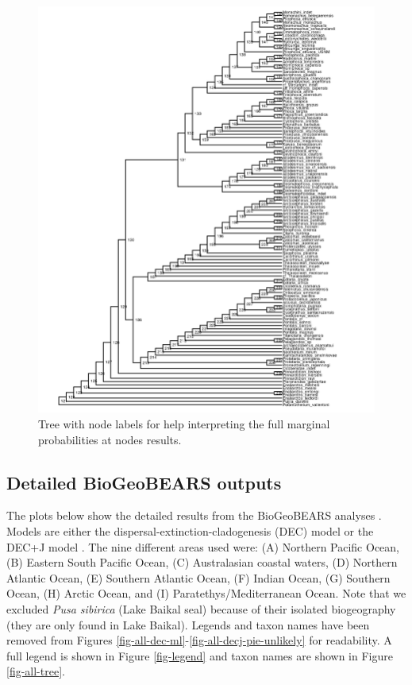 \documentclass[a4paper, 12pt]{article}
\begin{document}
\begin{figure}[H]
 \centering
  \includegraphics[width = \linewidth]{figures/node-labels-tree.png}
  \caption{Tree with node labels for help interpreting the full marginal probabilities at nodes results.}
  \label{fig-node-labels}
\end{figure}  

\subsection{Detailed BioGeoBEARS outputs}

The plots below show the detailed results from the BioGeoBEARS analyses \citep{matzke2013probabilistic}. Models are either the dispersal-extinction-cladogenesis (DEC) model \citep{ree2008maximum} or the DEC+J model \citep{matzke2014model}. 
The nine different areas used were: (A) Northern Pacific Ocean, (B) Eastern South Pacific Ocean, (C) Australasian coastal waters, (D) Northern Atlantic Ocean, (E) Southern Atlantic Ocean, (F) Indian Ocean, (G) Southern Ocean, (H) Arctic Ocean, and (I) Paratethys/Mediterranean Ocean. Note that we excluded \textit{Pusa sibirica} (Lake Baikal seal) because of their isolated biogeography (they are only found in Lake Baikal). 
Legends and taxon names have been removed from Figures \ref{fig-all-dec-ml}-\ref{fig-all-decj-pie-unlikely} for readability. 
A full legend is shown in Figure \ref{fig-legend} and taxon names are shown in Figure \ref{fig-all-tree}.
\end{document}
